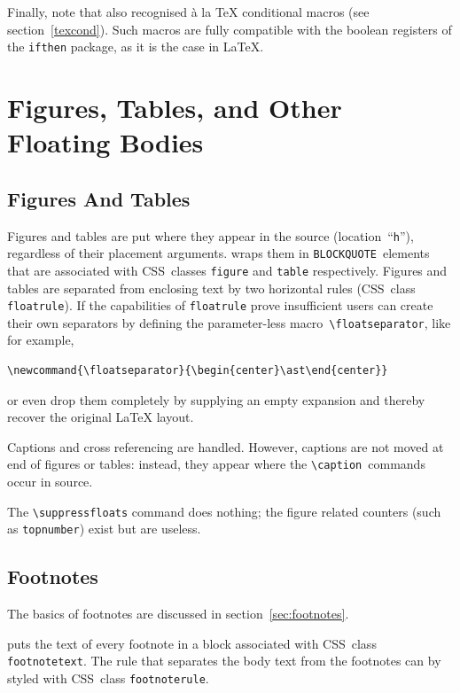 Finally, note that \hevea{} also recognised \`a la \TeX{} conditional
macros (see section~\ref{texcond}). Such macros are fully compatible
with the boolean registers of the \texttt{ifthen} package, as it is
the case in \LaTeX.


\section{Figures, Tables, and Other Floating Bodies}

\subsection{Figures And Tables}

Figures and tables are put where they appear in the source
(location~``\verb+h+''), regardless of their placement arguments.
\hevea{} wraps them in \verb+BLOCKQUOTE+~elements that are associated
with CSS~classes \verb+figure+ and \verb+table+ respectively.  Figures
and tables are separated from enclosing text by two horizontal rules
(CSS~class \verb+floatrule+).  If the capabilities of \verb+floatrule+
prove insufficient users can create their own separators by defining
the parameter-less macro~\verb+\floatseparator+, like for example,

\begin{verbatim}
\newcommand{\floatseparator}{\begin{center}\ast\end{center}}
\end{verbatim}

\noindent or even drop them completely by supplying an empty expansion
and thereby recover the original \LaTeX{} layout.

Captions and cross referencing are handled.  However, captions are not
moved at end of figures or tables: instead, they appear where the
\verb+\caption+~commands occur in source.

The \verb+\suppressfloats+ command does nothing; the figure related
counters (such as \verb+topnumber+) exist but are useless.


\subsection{Footnotes}

The basics of footnotes are discussed in section~\ref{sec:footnotes}.

\hevea{} puts the text of every footnote in a block associated with
CSS~class \verb+footnotetext+.  The rule that separates the body text
from the footnotes can by styled with CSS~class \verb+footnoterule+.


